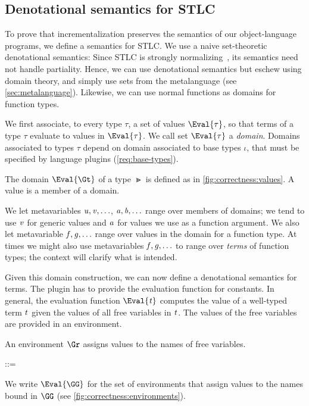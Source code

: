 \subsection{Denotational semantics for STLC}
\label{sec:denotational-sem}
To prove that incrementalization preserves the semantics of our
object-language programs, we define a semantics for STLC\@. We use
a naive set-theoretic denotational semantics: Since STLC is
strongly normalizing~\citep[Ch.~12]{Pierce02TAPL}, its semantics
need not handle partiality. Hence, we can use denotational
semantics but eschew using domain theory, and simply use sets
from the metalanguage (see \cref{sec:metalanguage}). Likewise, we
can use normal functions as domains for function types.

We first associate, to every type \ensuremath{\tau}, a set of values
\ensuremath{\Eval{\tau}}, so that terms of a type \ensuremath{\tau} evaluate to values in
\ensuremath{\Eval{\tau}}. We call set \ensuremath{\Eval{\tau}} a \emph{domain}. Domains
associated to types \ensuremath{\tau} depend on domain associated to base
types \ensuremath{\iota}, that must be specified by language plugins
(\cref{req:base-types}).

\begin{definition}
  The domain $\Eval{\Gt}$ of a type $\Gt$ is defined as in
  \cref{fig:correctness:values}. A value is a member of a domain.
\end{definition}

We let metavariables \ensuremath{\Varid{u},\Varid{v},\ldots}, \ensuremath{\Varid{a},\Varid{b},\ldots} range over members
of domains; we tend to use \ensuremath{\Varid{v}} for generic values and \ensuremath{\Varid{a}} for
values we use as a function argument. We also let metavariable
\ensuremath{\Varid{f},\Varid{g},\ldots} range over values in the domain for a function type.
At times we might also use metavariables \ensuremath{\Varid{f},\Varid{g},\ldots} to range
over \emph{terms} of function types; the context will clarify
what is intended.

Given this domain construction, we can now define a denotational
semantics for terms. The plugin has to provide the evaluation
function for constants. In general, the evaluation function
\ensuremath{\Eval{\Varid{t}}} computes the value of a well-typed term \ensuremath{\Varid{t}} given the
values of all free variables in \ensuremath{\Varid{t}}. The values of the free
variables are provided in an environment.

\begin{definition}[Environments]
  An environment $\Gr$ assigns values to the names of free
  variables.

  \begin{syntax}
    \Gr ::= \EmptyContext \mid {}
  \end{syntax}

  We write $\Eval{\GG}$ for the set of
  environments that assign values to the names bound in $\GG$
  (see \cref{fig:correctness:environments}).
\end{definition}

